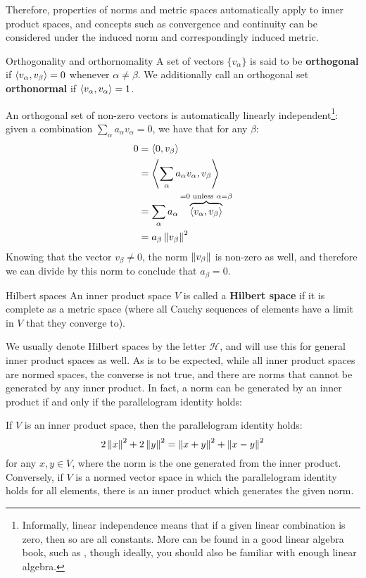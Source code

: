 Therefore, properties of norms and metric spaces automatically apply to inner product spaces, and concepts such as convergence and continuity can be considered under the induced norm and correspondingly induced metric.

\begin{bdefin}{Orthogonality and orthornomality}{}
A set of vectors $\{v_{\alpha} \}$ is said to be \textbf{orthogonal} if $\left\langle v_{\alpha}, v_{\beta} \right\rangle=0$ whenever $\alpha \neq \beta$. We additionally call an orthogonal set \textbf{orthonormal} if $\left\langle v_{\alpha}, v_{\alpha} \right\rangle = 1$.
\end{bdefin}

An orthogonal set of non-zero vectors is automatically linearly independent\footnote{Informally, linear independence means that if a given linear combination is zero, then so are all constants. More can be found in a good linear algebra book, such as \cite{joshua}, though ideally, you should also be familiar with enough linear algebra.}: given a combination $\sum_{\alpha} a_{\alpha} v_{\alpha} = 0 $, we have that for any $\beta$:
\begin{equation}
\begin{split}
    0 &= \left\langle 0, v_{\beta} \right\rangle \\
    &= \left\langle  \sum_{\alpha} a_{\alpha} v_{\alpha},  v_{\beta} \right\rangle \\
    &= \sum_{\alpha} a_{\alpha} \overbrace{\left\langle v_{\alpha}, v_{\beta} \right\rangle}^{ =0 \text{ unless } \alpha=\beta } \\
    &= a_{\beta}\left\lVert v_{\beta} \right\rVert^{2}
\end{split}
\end{equation}
Knowing that the vector $v_{\beta}\neq 0$, the norm $\left\lVert v_{\beta} \right\rVert$ is non-zero as well, and therefore we can divide by this norm to conclude that $a_{\beta}=0$.

\begin{bdefin}{Hilbert spaces}{}
An inner product space $V$ is called a \textbf{Hilbert space} if it is complete as a metric space (where all Cauchy sequences of elements have a limit in $V$ that they converge to).
\end{bdefin}

We usually denote Hilbert spaces by the letter $\mathcal{H}$, and will use this for general inner product spaces as well. As is to be expected, while all inner product spaces are normed spaces, the converse is not true, and there are norms that cannot be generated by any inner product. In fact, a norm can be generated by an inner product if and only if the parallelogram identity holds:
\begin{btheorem}{}{}
If $V$ is an inner product space, then the parallelogram identity holds:
\[ 2\left\lVert x \right\rVert^{2} + 2\left\lVert y \right\rVert^{2} = \left\lVert x+y \right\rVert^{2} + \left\lVert x-y \right\rVert^{2} \]
for any $x,y \in V$, where the norm is the one generated from the inner product. Conversely, if $V$ is a normed vector space in which the parallelogram identity holds for all elements, there is an inner product which generates the given norm.
\end{btheorem}

